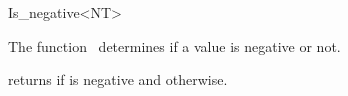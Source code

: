 \begin{ccRefFunctionObjectClass}{Is_negative<NT>}

\ccDefinition

The function \ccRefName\ determines if a value is negative or not.


\ccIsModel
{}

{returns  if  is negative and  otherwise.}

\end{ccRefFunctionObjectClass}

